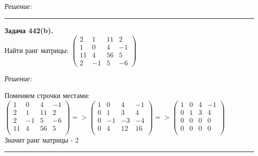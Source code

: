 \documentclass[a4paper, 12pt]{article}
\newenvironment{problem}[2][Задача]
    { \begin{mdframed}[backgroundcolor=gray!10] \textbf{#1 #2.} \\}
    {  \end{mdframed}}
\newenvironment{solution}
    {\textit{Решение: }}
    {\noindent\rule{7in}{1.5pt}}
\begin{document}
\begin{solution}
\end{solution}

\begin{problem}{442(b)}
Найти ранг матрицы:
$\left(\begin{array}{rrrr}2 & 1 & 11 & 2\\1 & 0 & 4 & -1\\ 11 & 4 & 56 & 5 \\ 2 & -1 & 5 & -6\end{array}\right)$


\end{problem}
\begin{solution}

Поменяем строчки местами: \\
$
\left(
  \begin{array}{rrrr}
    1 & 0 & 4 & -1 \\
    2 & 1 & 11 & 2 \\
    2 & -1 & 5 & -6 \\
    11 & 4 & 56 & 5 \\
  \end{array}
\right)
=>
\left(
  \begin{array}{rrrr}
    1 & 0 & 4 & -1 \\
    0 & 1 & 3 & 4 \\
    0 & -1 & -3 & -4 \\
    0 & 4 & 12 & 16 \\
  \end{array}
\right)
=>
\left(
  \begin{array}{rrrr}
    1 & 0 & 4 & -1 \\
    0 & 1 & 3 & 4 \\
    0 & 0 & 0 & 0 \\
    0 & 0 & 0 & 0 \\
  \end{array}
\right)
$
\\
Значит ранг матрицы - 2

\end{solution}
\end{document}
